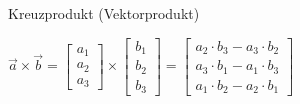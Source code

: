 \begin{sectionbox}
	Kreuzprodukt (Vektorprodukt)
	\begin{emphbox}
		$\overrightarrow{a} \times \overrightarrow{b} = \begin{bmatrix} a_1 \\ a_2 \\ a_3 \end{bmatrix} \times \begin{bmatrix} b_1 \\ b_2 \\ b_3 \end{bmatrix} = \begin{bmatrix} a_2 \cdot b_3 - a_3 \cdot b_2 \\ a_3 \cdot b_1 - a_1 \cdot b_3 \\ a_1 \cdot b_2 - a_2 \cdot b_1 \end{bmatrix} $
	\end{emphbox}
	
\end{sectionbox}
